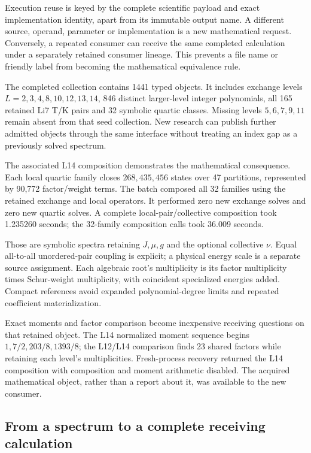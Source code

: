 Execution reuse is keyed by the complete scientific payload and exact implementation identity, apart from its immutable output name. A different source, operand, parameter or implementation is a new mathematical request. Conversely, a repeated consumer can receive the same completed calculation under a separately retained consumer lineage. This prevents a file name or friendly label from becoming the mathematical equivalence rule.

The completed collection contains 1441 typed objects. It includes exchange levels $L=2,3,4,8,10,12,13,14$, 846 distinct larger-level integer polynomials, all 165 retained Li7 T/K pairs and 32 symbolic quartic classes. Missing levels $5,6,7,9,11$ remain absent from that seed collection. New research can publish further admitted objects through the same interface without treating an index gap as a previously solved spectrum.

The associated L14 composition demonstrates the mathematical consequence. Each local quartic family closes $268{,}435{,}456$ states over 47 partitions, represented by 90,772 factor/weight terms. The batch composed all 32 families using the retained exchange and local operators. It performed zero new exchange solves and zero new quartic solves. A complete local-pair/collective composition took 1.235260 seconds; the 32-family composition calls took 36.009 seconds.

Those are symbolic spectra retaining $J,\mu,g$ and the optional collective $\nu$. Equal all-to-all unordered-pair coupling is explicit; a physical energy scale is a separate source assignment. Each algebraic root's multiplicity is its factor multiplicity times Schur-weight multiplicity, with coincident specialized energies added. Compact references avoid expanded polynomial-degree limits and repeated coefficient materialization.

Exact moments and factor comparison become inexpensive receiving questions on that retained object. The L14 normalized moment sequence begins $1,7/2,203/8,1393/8$; the L12/L14 comparison finds 23 shared factors while retaining each level's multiplicities. Fresh-process recovery returned the L14 composition with composition and moment arithmetic disabled. The acquired mathematical object, rather than a report about it, was available to the new consumer.

\subsection{From a spectrum to a complete receiving calculation}
\label{v3-runtime-complete-source}

